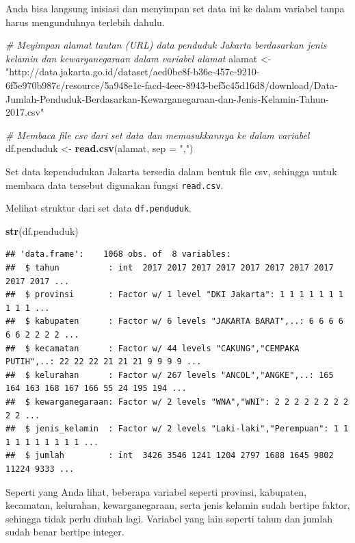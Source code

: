 \documentclass[openany]{book}
\newenvironment{Shaded}{\begin{snugshade}}{\end{snugshade}}
\newcommand{\KeywordTok}[1]{\textcolor[rgb]{0.13,0.29,0.53}{\textbf{#1}}}
\newcommand{\DataTypeTok}[1]{\textcolor[rgb]{0.13,0.29,0.53}{#1}}
\newcommand{\StringTok}[1]{\textcolor[rgb]{0.31,0.60,0.02}{#1}}
\newcommand{\CommentTok}[1]{\textcolor[rgb]{0.56,0.35,0.01}{\textit{#1}}}
\newcommand{\NormalTok}[1]{#1}
\begin{document}
Anda bisa langsung inisiasi dan menyimpan set data ini ke dalam variabel
tanpa harus mengunduhnya terlebih dahulu.

\begin{Shaded}
\begin{Highlighting}[]
\CommentTok{# Meyimpan alamat tautan (URL) data penduduk Jakarta berdasarkan jenis kelamin dan kewarganegaraan dalam variabel alamat}
\NormalTok{alamat <-}\StringTok{ "http://data.jakarta.go.id/dataset/aed0be8f-b36e-457c-9210-6f5e970b987c/resource/5a948e1c-facd-4eec-8943-bef5c45d16d8/download/Data-Jumlah-Penduduk-Berdasarkan-Kewarganegaraan-dan-Jenis-Kelamin-Tahun-2017.csv"}

\CommentTok{# Membaca file csv dari set data dan memasukkannya ke dalam variabel}
\NormalTok{df.penduduk <-}\StringTok{ }\KeywordTok{read.csv}\NormalTok{(alamat, }\DataTypeTok{sep =} \StringTok{","}\NormalTok{)}
\end{Highlighting}
\end{Shaded}

Set data kependudukan Jakarta tersedia dalam bentuk file csv, sehingga
untuk membaca data tersebut digunakan fungsi \texttt{read.csv}.

Melihat struktur dari set data \texttt{df.penduduk}.

\begin{Shaded}
\begin{Highlighting}[]
\KeywordTok{str}\NormalTok{(df.penduduk)}
\end{Highlighting}
\end{Shaded}

\begin{verbatim}
## 'data.frame':    1068 obs. of  8 variables:
##  $ tahun          : int  2017 2017 2017 2017 2017 2017 2017 2017 2017 2017 ...
##  $ provinsi       : Factor w/ 1 level "DKI Jakarta": 1 1 1 1 1 1 1 1 1 1 ...
##  $ kabupaten      : Factor w/ 6 levels "JAKARTA BARAT",..: 6 6 6 6 6 6 2 2 2 2 ...
##  $ kecamatan      : Factor w/ 44 levels "CAKUNG","CEMPAKA PUTIH",..: 22 22 22 21 21 21 9 9 9 9 ...
##  $ kelurahan      : Factor w/ 267 levels "ANCOL","ANGKE",..: 165 164 163 168 167 166 55 24 195 194 ...
##  $ kewarganegaraan: Factor w/ 2 levels "WNA","WNI": 2 2 2 2 2 2 2 2 2 2 ...
##  $ jenis_kelamin  : Factor w/ 2 levels "Laki-laki","Perempuan": 1 1 1 1 1 1 1 1 1 1 ...
##  $ jumlah         : int  3426 3546 1241 1204 2797 1688 1645 9802 11224 9333 ...
\end{verbatim}

Seperti yang Anda lihat, beberapa variabel seperti provinsi, kabupaten,
kecamatan, kelurahan, kewarganegaraan, serta jenis kelamin sudah bertipe
faktor, sehingga tidak perlu diubah lagi. Variabel yang lain seperti
tahun dan jumlah sudah benar bertipe integer.
\end{document}
